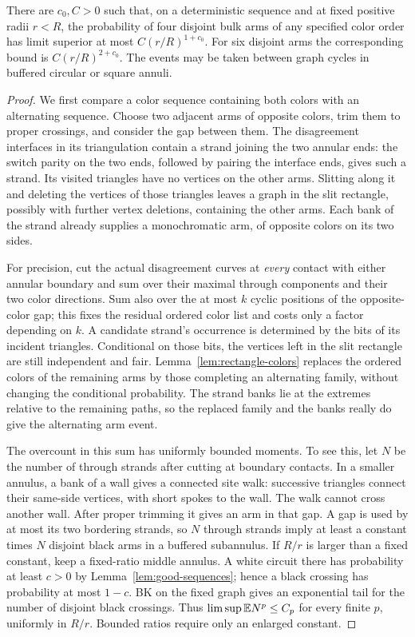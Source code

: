 \begin{lemma}\label{lem:color-arms}
There are $c_0,C>0$ such that, on a deterministic sequence and at
fixed positive radii $r<R$, the probability of four disjoint bulk
arms of any specified color order has limit superior at most
$C(r/R)^{1+c_0}$.  For six disjoint arms the corresponding bound
is $C(r/R)^{2+c_0}$.  The events may be taken between graph cycles
in buffered circular or square annuli.
\end{lemma}

\begin{proof}
We first compare a color sequence containing both colors with an
alternating sequence.  Choose two adjacent arms of opposite
colors, trim them to proper crossings, and consider the gap
between them.  The disagreement interfaces in its triangulation
contain a strand joining the two annular ends: the switch parity
on the two ends, followed by pairing the interface ends, gives
such a strand.  Its visited triangles have no vertices on the
other arms.  Slitting along it and deleting the vertices of those
triangles leaves a graph in the slit rectangle, possibly with
further vertex deletions, containing the other arms.  Each bank
of the strand already supplies a monochromatic
arm, of opposite colors on its two sides.

For precision, cut the actual disagreement curves at \emph{every}
contact with either annular boundary and sum over their maximal
through components and their two color directions.  Sum also
over the at most $k$ cyclic positions of the opposite-color gap;
this fixes the residual ordered color list and costs only a
factor depending on $k$.  A candidate strand's occurrence
is determined by the bits of its incident triangles.  Conditional
on those bits, the vertices left in the slit rectangle are still
independent and fair.  Lemma~\ref{lem:rectangle-colors} replaces
the ordered colors of the remaining arms by those completing an
alternating family, without changing the conditional probability.
The strand banks lie at the extremes relative to the remaining
paths, so the replaced family and the banks really do give the
alternating arm event.

The overcount in this sum has uniformly bounded moments.  To see
this, let $N$ be the number of through strands after cutting at
boundary contacts.  In a smaller annulus, a bank of a wall gives
a connected site walk: successive triangles connect their
same-side vertices, with short spokes to the wall.  The walk
cannot cross another wall.  After proper trimming it gives an
arm in that gap.  A gap is used by at most its two bordering
strands, so $N$ through strands imply at least a constant times
$N$ disjoint black arms in a buffered subannulus.  If $R/r$ is
larger than a fixed constant, keep a fixed-ratio middle annulus.
A white circuit there has probability at least $c>0$ by
Lemma~\ref{lem:good-sequences}; hence a black crossing has
probability at most $1-c$.  BK on the fixed graph gives an
exponential tail for the number of disjoint black crossings.
Thus $\limsup\mathbb E N^p\le C_p$ for every finite $p$,
uniformly in $R/r$.  Bounded ratios require only an enlarged
constant.


\end{proof}
